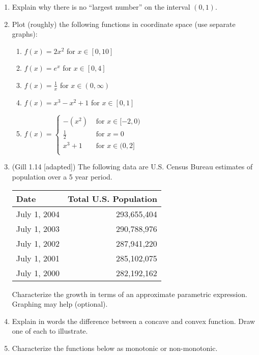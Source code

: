\documentclass[11pt]{article}
\begin{document}
\begin{enumerate}
\item Explain why there is no ``largest number'' on the interval $(0,1)$.


\item Plot (roughly) the following functions in coordinate space (use separate graphs):
\begin{enumerate}
\item $f(x) = 2x^2$ for $x \in [0,10]$
\item $f(x) = e^{x}$ for $x \in [0,4]$
\item $f(x) = \frac{1}{x}$ for $x \in (0,\infty)$
\item $f(x) = x^3 - x^2 + 1$ for $x \in [0,1]$
\item $f(x)=\left\{\begin{array}{cl}
	-(x^2)  & \textrm{~for~} x \in [-2,0)\\
	\frac{1}{2} & \textrm{~for~} x = 0\\
    x^3 + 1 & \textrm{~for~} x \in (0,2]\\
	   \end{array}\right.$
\end{enumerate}



\item (Gill 1.14 [adapted]) The following data are U.S. Census Bureau estimates of population over a 5 year period.

\begin{center}
\begin{tabular}{lr}
Date         & Total U.S. Population \\ \hline
July 1, 2004 & 293,655,404 \\
July 1, 2003 & 290,788,976 \\
July 1, 2002 & 287,941,220 \\
July 1, 2001 & 285,102,075 \\
July 1, 2000 & 282,192,162 \\ \hline
\end{tabular}
\end{center}

Characterize the growth in terms of an approximate parametric expression.  Graphing may help (optional).


\item Explain in words the difference between a concave and convex function.  Draw one of each to illustrate. 


\item Characterize the functions below as monotonic or non-monotonic.


\end{enumerate}
\end{document}
